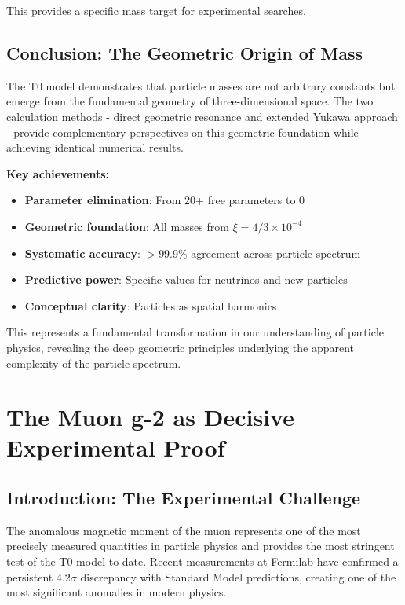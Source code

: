 \documentclass[12pt,a4paper]{report}
\begin{document}
This provides a specific mass target for experimental searches.

\section{Conclusion: The Geometric Origin of Mass}
\label{sec:conclusion_geometric_mass}

The T0 model demonstrates that particle masses are not arbitrary constants but emerge from the fundamental geometry of three-dimensional space. The two calculation methods - direct geometric resonance and extended Yukawa approach - provide complementary perspectives on this geometric foundation while achieving identical numerical results.

\textbf{Key achievements:}

\begin{itemize}
	\item \textbf{Parameter elimination}: From 20+ free parameters to 0
	\item \textbf{Geometric foundation}: All masses from $\xi = 4/3 \times 10^{-4}$
	\item \textbf{Systematic accuracy}: $> 99.9\%$ agreement across particle spectrum
	\item \textbf{Predictive power}: Specific values for neutrinos and new particles
	\item \textbf{Conceptual clarity}: Particles as spatial harmonics
\end{itemize}

This represents a fundamental transformation in our understanding of particle physics, revealing the deep geometric principles underlying the apparent complexity of the particle spectrum.	
	\chapter{The Muon g-2 as Decisive Experimental Proof}
\label{chap:muon_g2}

\section{Introduction: The Experimental Challenge}
\label{sec:muon_g2_introduction}

The anomalous magnetic moment of the muon represents one of the most precisely measured quantities in particle physics and provides the most stringent test of the T0-model to date. Recent measurements at Fermilab have confirmed a persistent 4.2$\sigma$ discrepancy with Standard Model predictions, creating one of the most significant anomalies in modern physics.
\end{document}

